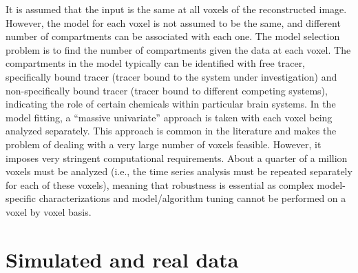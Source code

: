It is assumed that the input is the same at all voxels of the reconstructed image. However, the model for each voxel is not assumed to be the same, and different number of compartments can be associated with each one. The model selection problem is to find the number of compartments given the data at each voxel. The compartments in the model typically can be identified with free tracer, specifically bound tracer (tracer bound to the system under investigation) and non-specifically bound tracer (tracer bound to different competing systems), indicating the role of certain chemicals within particular brain systems. In the model fitting, a ``massive univariate'' approach is taken with each voxel being analyzed separately. This approach is common in the literature and makes the problem of dealing with a very large number of voxels feasible. However, it imposes very stringent computational requirements. About a quarter of a million voxels must be analyzed (i.e., the time series analysis must be repeated separately for each of these voxels), meaning that robustness is essential as complex model-specific characterizations and model/algorithm tuning cannot be performed on a voxel by voxel basis.

\section{Simulated and real \protect\pet data}
\label{sec:Simulated and real pet data}



